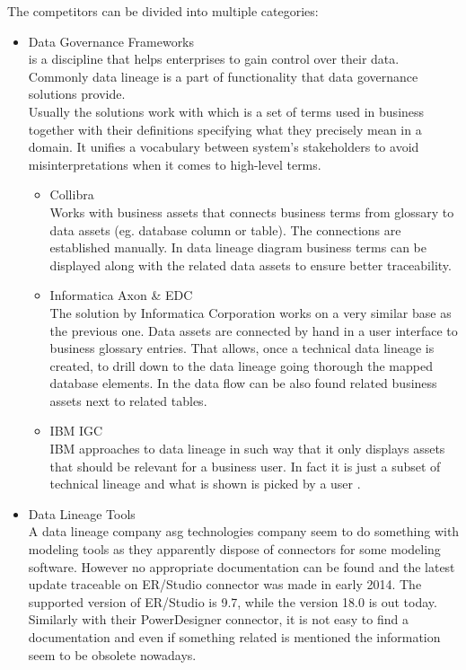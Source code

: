 The competitors can be divided into multiple categories:

\begin{itemize}
	\item Data Governance Frameworks \\ 
	 is a discipline that helps enterprises to gain control over their data. Commonly data lineage is a part of functionality that data governance solutions provide. \\
	Usually the solutions work with  which is a set of terms used in business together with their definitions specifying what they precisely mean in a domain. It unifies a vocabulary between system's stakeholders to avoid misinterpretations when it comes to high-level terms. 
	\begin{itemize}
		\item Collibra \\ 
		Works with business assets that connects business terms from glossary to data assets (eg. database column or table). The connections are established manually\cite{CollibraBusinessAssets}. In data lineage diagram business terms can be displayed along with the related data assets to ensure better traceability\cite{CollibraVisualization}.
		\item Informatica Axon \& EDC \\ 
		The solution by Informatica Corporation works on a very similar base as the previous one.
		Data assets are connected by hand in a user interface to business glossary entries\cite{InformaticaBusinessAssets}. That allows, once a technical data lineage is created, to drill down to the data lineage going thorough the mapped database elements. In the data flow can be also found related business assets next to related tables.
		\item IBM IGC \\ 
		IBM approaches to data lineage in such way that it only displays assets that should be relevant for a business user. In fact it is just a subset of technical lineage and what is shown is picked by a user \cite{IbmIgcBusinessLineage}.
	\end{itemize}
	\item Data Lineage Tools \\ 
		A data lineage company asg technologies company seem to do something with modeling tools as they apparently dispose of connectors for some modeling software. However no appropriate documentation can be found and the latest update traceable on ER/Studio connector was made in early 2014.  %
		The supported version of ER/Studio is 9.7, while the version 18.0 is out today.
		Similarly with their PowerDesigner connector, it is not easy to find a documentation and even if something related is mentioned the information seem to be obsolete nowadays.
	

\end{itemize}
